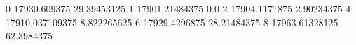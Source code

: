 0 17930.609375 29.39453125
1 17901.21484375 0.0
2 17904.1171875 2.90234375
4 17910.037109375 8.822265625
6 17929.4296875 28.21484375
8 17963.61328125 62.3984375
